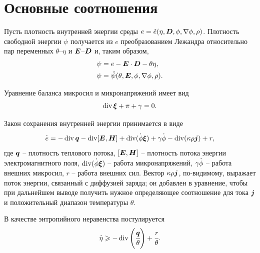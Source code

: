 
\section{Основные соотношения}

Пусть плотность внутренней энергии среды $e = \hat{e}(\eta, {\boldsymbol{D}}, \phi, \nabla \phi, \rho)$. Плотность свободной энергии $\psi$ получается из $e$ преобразованием Лежандра относительно пар переменных $\theta$--$\eta$ и ${\boldsymbol{E}}$--${\boldsymbol{D}}$ и, таким образом,
\begin{align}
    \psi &= e - {\boldsymbol{E}} \cdot {\boldsymbol{D}} - \theta \eta,
    \label{eq:free_energy_density} \\
    \psi &= \hat{\psi}(\theta, {\boldsymbol{E}}, \phi, \nabla \phi, \rho).
    \nonumber
\end{align}

Уравнение баланса микросил и микронапряжений имеет вид
\begin{equation}
    \operatorname{{div}} {\boldsymbol{\xi}} + \pi + \gamma = 0.
    \label{eq:microforces}
\end{equation}

Закон сохранения внутренней энергии принимается в виде
\begin{equation}
    \overset{\boldsymbol{.}}{e} = -\operatorname{{div}} {\boldsymbol{q}} - \operatorname{{div}}[{\boldsymbol{E}}, \boldsymbol{H}] + \operatorname{{div}}(\overset{\boldsymbol{.}}{\phi} {\boldsymbol{\xi}}) + \gamma \overset{\boldsymbol{.}}{\phi} - \operatorname{{div}}(\kappa \rho {\boldsymbol{j}}) + r,
    \label{eq:energy_conservation}
\end{equation}
где ${\boldsymbol{q}}$ -- плотность теплового потока, $[{\boldsymbol{E}}, \boldsymbol{H}]$ -- плотность потока энергии электромагнитного поля, $\operatorname{{div}}(\overset{\boldsymbol{.}}{\phi} {\boldsymbol{\xi}})$ -- работа микронапряжений, $\gamma \overset{\boldsymbol{.}}{\phi}$ -- работа внешних микросил, $r$ -- работа внешних сил. Вектор $\kappa \rho {\boldsymbol{j}}$, по-видимому, выражает поток энергии, связанный с диффузией заряда; он добавлен в уравнение, чтобы при дальнейшем выводе получить нужное определяющее соотношение для тока ${\boldsymbol{j}}$ и положительный диапазон температуры $\theta$.

В качестве энтропийного неравенства постулируется
\begin{equation}
    \overset{\boldsymbol{.}}{\eta} \geqslant -\operatorname{{div}} \left( \cfrac{{\boldsymbol{q}}}{\theta} \right) + \cfrac{r}{\theta}.
    \label{eq:entropy_inequality}
\end{equation}